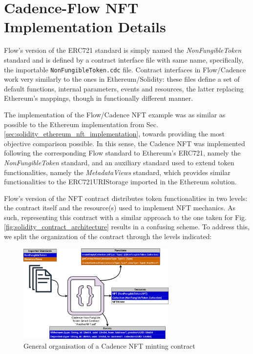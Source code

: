 \documentclass[../main.tex]{subfiles}
\begin{document}
\section{Cadence-Flow NFT Implementation Details}
\label{sec:cadence_flow_nft_implementation}
Flow's version of the ERC721 standard is simply named the \textit{NonFungibleToken} standard and is defined by a contract interface file with same name, specifically, the importable \verb|NonFungibleToken.cdc| file. Contract interfaces in Flow/Cadence work very similarly to the ones in Ethereum/Solidity: these files define a set of default functions, internal parameters, events and resources, the latter replacing Ethereum's mappings, though in functionally different manner.
\par
The implementation of the Flow/Cadence NFT example was as similar as possible to the Ethereum implementation from Sec. \ref{sec:solidity_ethereum_nft_implementation}, towards providing the most objective comparison possible. In this sense, the Cadence NFT was implemented following the corresponding Flow standard to Ethereum's ERC721, namely the \textit{NonFungibleToken} standard, and an auxiliary standard used to extend token functionalities, namely the \textit{MetadataViews} standard, which provides similar functionalities to the ERC721URIStorage imported in the Ethereum solution.
\par
Flow's version of the NFT contract distributes token functionalities in two levels: the contract itself and the resource(s) used to implement NFT mechanics. As such, representing this contract with a similar approach to the one taken for Fig. \ref{fig:solidity_contract_architecture} results in a confusing scheme. To address this, we split the organization of the contract through the levels indicated:

\begin{figure}[htp]
    \centering
    \includegraphics[width=0.7\textwidth]{../Images/05_Cadence_NFT_Contract_Arch.png}
    \caption{General organisation of a Cadence NFT minting contract}
    \label{fig:cadence_contract_architecture}
\end{figure}
\end{document}
